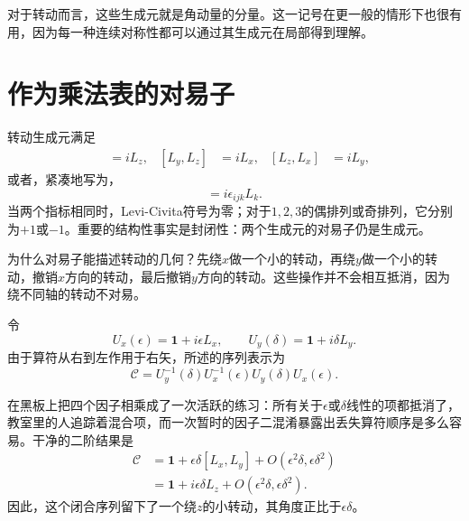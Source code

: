 对于转动而言，这些生成元就是角动量的分量。这一记号在更一般的情形下也很有用，因为每一种连续对称性都可以通过其生成元在局部得到理解。

\section{作为乘法表的对易子}

转动生成元满足
\begin{align}
[L_x,L_y]&=iL_z,&
[L_y,L_z]&=iL_x,&
[L_z,L_x]&=iL_y,
\end{align}
或者，紧凑地写为，
\begin{equation}
[L_i,L_j]=i\epsilon_{ijk}L_k.
\end{equation}
当两个指标相同时，Levi-Civita符号为零；对于\(1,2,3\)的偶排列或奇排列，它分别为\(+1\)或\(-1\)。重要的结构性事实是封闭性：两个生成元的对易子仍是生成元。

为什么对易子能描述转动的几何？先绕\(x\)做一个小的转动，再绕\(y\)做一个小的转动，撤销\(x\)方向的转动，最后撤销\(y\)方向的转动。这些操作并不会相互抵消，因为绕不同轴的转动不对易。

\begin{classroomqa}
\end{classroomqa}

令
\begin{equation}
U_x(\epsilon)=\mathbf 1+i\epsilon L_x,
\qquad
U_y(\delta)=\mathbf 1+i\delta L_y.
\end{equation}
由于算符从右到左作用于右矢，所述的序列表示为
\begin{equation}
\mathcal C
=U_y^{-1}(\delta)U_x^{-1}(\epsilon)
 U_y(\delta)U_x(\epsilon).
\end{equation}

\begin{classroomqa}
\end{classroomqa}

在黑板上把四个因子相乘成了一次活跃的练习：所有关于\(\epsilon\)或\(\delta\)线性的项都抵消了，教室里的人追踪着混合项，而一次暂时的因子二混淆暴露出丢失算符顺序是多么容易。干净的二阶结果是
\begin{align}
\mathcal C
&=\mathbf 1+\epsilon\delta[L_x,L_y]
  +O(\epsilon^2\delta,\epsilon\delta^2)\\
&=\mathbf 1+i\epsilon\delta L_z
  +O(\epsilon^2\delta,\epsilon\delta^2).
\end{align}
因此，这个闭合序列留下了一个绕\(z\)的小转动，其角度正比于\(\epsilon\delta\)。

